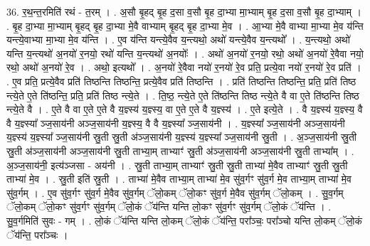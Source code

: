 \documentclass[17pt]{extarticle}
\begin{document}
36. र॒थ॒न्त॒रमिति॑ रथं - त॒रम् । . अ॒सौ बृ॒हद् बृ॒ह द॒सा व॒सौ बृ॒ह दा॒भ्या मा॒भ्याम् बृ॒ह द॒सा व॒सौ बृ॒ह दा॒भ्याम् । . बृ॒ह दा॒भ्या मा॒भ्याम् बृ॒हद् बृ॒ह दा॒भ्या मे॒वै वाभ्याम् बृ॒हद् बृ॒ह दा॒भ्या मे॒व । . आ॒भ्या मे॒वै वाभ्या मा॒भ्या मे॒व य॑न्ति यन्त्ये॒वाभ्या मा॒भ्या मे॒व य॑न्ति । . ए॒व य॑न्ति यन्त्ये॒वैव य॒न्त्यथो॒ अथो॑ यन्त्ये॒वैव य॒न्त्यथो᳚ । . य॒न्त्यथो॒ अथो॑ यन्ति य॒न्त्यथो॑ अ॒नयो॑ र॒नयो॒ रथो॑ यन्ति य॒न्त्यथो॑ अ॒नयोः᳚ । . अथो॑ अ॒नयो॑ र॒नयो॒ रथो॒ अथो॑ अ॒नयो॑ रे॒वैवा नयो॒ रथो॒ अथो॑ अ॒नयो॑ रे॒व । . अथो॒ इत्यथो᳚ । . अ॒नयो॑ रे॒वैवा नयो॑ र॒नयो॑ रे॒व प्रति॒ प्रत्ये॒वा नयो॑ र॒नयो॑ रे॒व प्रति॑ । . ए॒व प्रति॒ प्रत्ये॒वैव प्रति॑ तिष्ठन्ति तिष्ठन्ति॒ प्रत्ये॒वैव प्रति॑ तिष्ठन्ति । . प्रति॑ तिष्ठन्ति तिष्ठन्ति॒ प्रति॒ प्रति॑ तिष्ठ न्त्ये॒ते ए॒ते ति॑ष्ठन्ति॒ प्रति॒ प्रति॑ तिष्ठ न्त्ये॒ते । . ति॒ष्ठ॒ न्त्ये॒ते ए॒ते ति॑ष्ठन्ति तिष्ठ न्त्ये॒ते वै वा ए॒ते ति॑ष्ठन्ति तिष्ठ न्त्ये॒ते वै । . ए॒ते वै वा ए॒ते ए॒ते वै य॒ज्ञ्स्य॑ य॒ज्ञ्स्य॒ वा ए॒ते ए॒ते वै य॒ज्ञ्स्य॑ । . ए॒ते इत्ये॒ते । . वै य॒ज्ञ्स्य॑ य॒ज्ञ्स्य॒ वै वै य॒ज्ञ्स्या᳚ ञ्ज॒साय॑नी अञ्ज॒साय॑नी य॒ज्ञ्स्य॒ वै वै य॒ज्ञ्स्या᳚ ञ्ज॒साय॑नी । . य॒ज्ञ्स्या᳚ ञ्ज॒साय॑नी अञ्ज॒साय॑नी य॒ज्ञ्स्य॑ य॒ज्ञ्स्या᳚ ञ्ज॒साय॑नी स्रु॒ती स्रु॒ती अ॑ञ्ज॒साय॑नी य॒ज्ञ्स्य॑ य॒ज्ञ्स्या᳚ ञ्ज॒साय॑नी स्रु॒ती । . अ॒ञ्ज॒साय॑नी स्रु॒ती स्रु॒ती अ॑ञ्ज॒साय॑नी अञ्ज॒साय॑नी स्रु॒ती ताभ्या॒म् ताभ्याꣳ॑ स्रु॒ती अ॑ञ्ज॒साय॑नी अञ्ज॒साय॑नी स्रु॒ती ताभ्या᳚म् । . अ॒ञ्ज॒साय॑नी॒ इत्य॑ञ्जसा - अय॑नी । . स्रु॒ती ताभ्या॒म् ताभ्याꣳ॑ स्रु॒ती स्रु॒ती ताभ्या॑ मे॒वैव ताभ्याꣳ॑ स्रु॒ती स्रु॒ती ताभ्या॑ मे॒व । . स्रु॒ती इति॑ स्रु॒ती । . ताभ्या॑ मे॒वैव ताभ्या॒म् ताभ्या॑ मे॒व सु॑व॒र्गꣳ सु॑व॒र्ग मे॒व ताभ्या॒म् ताभ्या॑ मे॒व सु॑व॒र्गम् । . ए॒व सु॑व॒र्गꣳ सु॑व॒र्ग मे॒वैव सु॑व॒र्गम् ॅलो॒कम् ॅलो॒कꣳ सु॑व॒र्ग मे॒वैव सु॑व॒र्गम् ॅलो॒कम् । . सु॒व॒र्गम् ॅलो॒कम् ॅलो॒कꣳ सु॑व॒र्गꣳ सु॑व॒र्गम् ॅलो॒कं ॅय॑न्ति यन्ति लो॒कꣳ सु॑व॒र्गꣳ सु॑व॒र्गम् ॅलो॒कं ॅय॑न्ति । . सु॒व॒र्गमिति॑ सुवः - गम् । . लो॒कं ॅय॑न्ति यन्ति लो॒कम् ॅलो॒कं ॅय॑न्ति॒ परा᳚ञ्चः॒ परा᳚ञ्चो यन्ति लो॒कम् ॅलो॒कं ॅय॑न्ति॒ परा᳚ञ्चः । \newline
\pagebreak
{}
\end{document}
